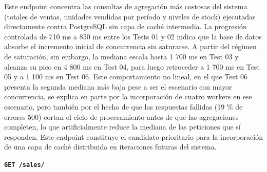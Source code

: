 Este endpoint concentra las consultas de agregación más costosas del sistema (totales de ventas, unidades vendidas por período y niveles de stock) ejecutadas directamente contra PostgreSQL sin capa de caché intermedia. La progresión controlada de 710 ms a 850 ms entre los Tests 01 y 02 indica que la base de datos absorbe el incremento inicial de concurrencia sin saturarse. A partir del régimen de saturación, sin embargo, la mediana escala hasta 1 700 ms en Test 03 y alcanza su pico en 4 800 ms en Test 04, para luego retroceder a 1 700 ms en Test 05 y a 1 100 ms en Test 06. Este comportamiento no lineal, en el que Test 06 presenta la segunda mediana más baja pese a ser el escenario con mayor concurrencia, se explica en parte por la incorporación de cuatro workers en ese escenario, pero también por el hecho de que las respuestas fallidas (19 \% de errores 500) cortan el ciclo de procesamiento antes de que las agregaciones completen, lo que artificialmente reduce la mediana de las peticiones que sí responden. Este endpoint constituye el candidato prioritario para la incorporación de una capa de caché distribuida en iteraciones futuras del sistema.

\textbf{\texttt{GET\ /sales/}}

